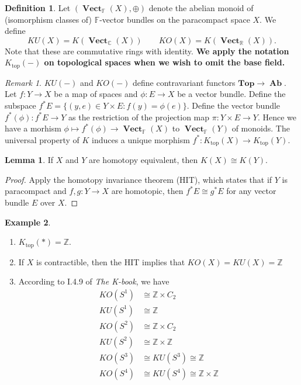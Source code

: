 \documentclass[10pt,letterpaper,cm]{nupset}
\theoremstyle{definition}
\newtheorem{definition}{Definition}
\newtheorem{exmp}[definition]{Example}
\theoremstyle{theorem}
\newtheorem{lemma}[theorem]{Lemma}
\theoremstyle{remark}
\newtheorem{remark}{Remark}
\newcommand{\C}{\mathbb C}
\newcommand{\F}{\mathbb F}
\newcommand{\R}{\mathbb R}
\newcommand{\Z}{\mathbb Z}
\newcommand{\1}{\mathbf{1}}
\newcommand{\0}{\vec 0}
\DeclareMathOperator{\vect}{\mathbf{Vect}}
\DeclareMathOperator{\topp}{\mathrm{top}}
\DeclareMathOperator{\Ab}{\mathbf{Ab}}
\begin{document}
\begin{definition}
Let $(\vect_{\F}(X), \oplus)$ denote the abelian monoid of (isomorphism classes of) $\F$-vector bundles on the paracompact space $X$. We define $$KU(X) = K(\vect_{\C}(X)) \quad \quad KO(X) = K(\vect_{\R}(X)).$$ Note that these are commutative rings with identity. \textbf{We apply the notation $K_{\topp}(-)$ on topological spaces when we wish to omit the base field.}
\end{definition}

\begin{remark}
$KU(-)$ and $KO(-)$ define contravariant functors $\mathbf{Top} \to \Ab$. Let $f: Y \to X$ be a map of spaces and $\phi : E \to X$ be a vector bundle. Define the subspace $f^{\ast}E = \{(y, e) \in Y \times E : f(y) = \phi(e)\}$.  Define the vector bundle $f^{\ast}(\phi) : f^{\ast}E \to Y$ as the restriction of the projection map $\pi : Y \times E \to Y$. Hence we have a morhism $\phi \mapsto f^{\ast}(\phi) \to \vect_{\F}(X)$ to $\vect_{\F}(Y)$ of monoids. The universal property of $K$ induces a unique morphism $f^{\ast}: K_{\topp}(X) \to K_{\topp}(Y)$.
\end{remark}

\begin{lemma}
If $X$ and $Y$ are homotopy equivalent, then $K(X) \cong K(Y)$.
\end{lemma}
\begin{proof}
Apply the homotopy invariance theorem (HIT), which states that if $Y$ is paracompact and $f, g: Y \to X$ are homotopic, then $f^{\ast}E \cong g^{\ast}E$ for any vector bundle $E$ over $X$.
\end{proof}

\begin{exmp} $ $
\begin{enumerate}
\item $K_{\topp}(\ast) = \Z$.
\item If $X$ is contractible, then the HIT implies that $KO(X) = KU(X) = \Z$
\item According to I.4.9 of \textit{The K-book}, we have
\begin{align*}
KO(S^1) & \cong \Z \times C_2 
\\ KU(S^1) &  \cong \Z \\
KO(S^2) & \cong \Z \times C_2  
\\  KU(S^2) & \cong \Z \times \Z
\\ KO(S^3) & \cong KU(S^3) \cong \Z 
\\ KO(S^4) & \cong KU(S^4) \cong \Z \times \Z
\end{align*}
\end{enumerate}
\end{exmp}
\end{document}

